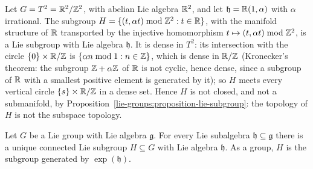 \begin{example}\label{lie-groups:example-irrational-line}
Let $G = T^2 = \mathbb{R}^2/\mathbb{Z}^2$, with abelian Lie algebra $\mathbb{R}^2$, and let $\mathfrak{h} = \mathbb{R}(1, \alpha)$ with $\alpha$ irrational. The subgroup
$H = \{(t, \alpha t) \bmod \mathbb{Z}^2 : t \in \mathbb{R}\}$, with the manifold structure of $\mathbb{R}$ transported by the injective homomorphism $t \mapsto (t, \alpha t) \bmod \mathbb{Z}^2$, is a
Lie subgroup with Lie algebra $\mathfrak{h}$. It is dense in $T^2$: its intersection with the circle $\{0\} \times \mathbb{R}/\mathbb{Z}$ is $\{\alpha n \bmod 1 : n \in \mathbb{Z}\}$, which is dense
in $\mathbb{R}/\mathbb{Z}$ (Kronecker's theorem: the subgroup $\mathbb{Z} + \alpha\mathbb{Z}$ of $\mathbb{R}$ is not cyclic, hence dense, since a subgroup of $\mathbb{R}$ with a smallest positive element is
generated by it); so $H$ meets every vertical circle $\{s\} \times \mathbb{R}/\mathbb{Z}$ in a dense set. Hence $H$ is not closed, and not a submanifold, by
Proposition~\ref{lie-groups:proposition-lie-subgroup}: the topology of $H$ is not the subspace topology.
\end{example}

\begin{theorem}\label{lie-groups:theorem-subalgebras-subgroups}
Let $G$ be a Lie group with Lie algebra $\mathfrak{g}$. For every Lie subalgebra $\mathfrak{h} \subseteq \mathfrak{g}$ there is a unique connected Lie subgroup $H \subseteq G$
with Lie algebra $\mathfrak{h}$. As a group, $H$ is the subgroup generated by $\exp(\mathfrak{h})$.
\end{theorem}

